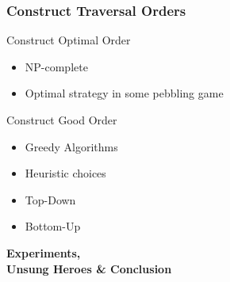 \documentclass{beamer}
\begin{document}
\begin{frame}

\frametitle{Construct Traversal Orders}

\begin{block}{Construct Optimal Order}

\begin{itemize}

\item NP-complete
\item Optimal strategy in some pebbling game

\end{itemize}

\end{block}

\begin{block}{Construct Good Order}

\begin{itemize}
	\item Greedy Algorithms
	\item Heuristic choices
	\item Top-Down
	\item Bottom-Up
\end{itemize}

\end{block}

\end{frame}



\begin{frame}

\centering \textbf{\huge{Experiments,\\ Unsung Heroes \& Conclusion}}

\end{frame}
\end{document}

